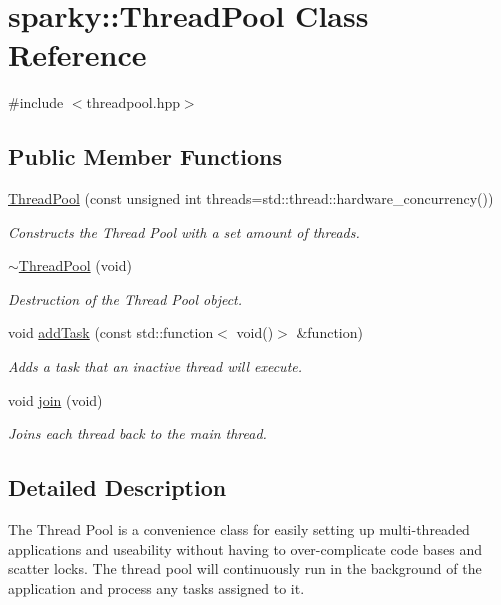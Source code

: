 \hypertarget{classsparky_1_1_thread_pool}{}\section{sparky\+:\+:Thread\+Pool Class Reference}
\label{classsparky_1_1_thread_pool}


{\ttfamily \#include $<$threadpool.\+hpp$>$}

\subsection*{Public Member Functions}
\begin{DoxyCompactItemize}
\item 
\hyperlink{classsparky_1_1_thread_pool_ac153de2ca1a6b692c48e000c7891e439}{Thread\+Pool} (const unsigned int threads=std\+::thread\+::hardware\+\_\+concurrency())
\begin{DoxyCompactList}\small\item\em Constructs the Thread Pool with a set amount of threads. \end{DoxyCompactList}\item 
\hyperlink{classsparky_1_1_thread_pool_ae54a60ab84b11b3bb6dcccea9ba4d841}{$\sim$\+Thread\+Pool} (void)
\begin{DoxyCompactList}\small\item\em Destruction of the Thread Pool object. \end{DoxyCompactList}\item 
void \hyperlink{classsparky_1_1_thread_pool_a3faeacdbbab736f1461c7ea53739e34f}{add\+Task} (const std\+::function$<$ void()$>$ \&function)
\begin{DoxyCompactList}\small\item\em Adds a task that an inactive thread will execute. \end{DoxyCompactList}\item 
void \hyperlink{classsparky_1_1_thread_pool_a24ce7704a54be1f5b956d61bc6c0fc7f}{join} (void)
\begin{DoxyCompactList}\small\item\em Joins each thread back to the main thread. \end{DoxyCompactList}\end{DoxyCompactItemize}


\subsection{Detailed Description}
The Thread Pool is a convenience class for easily setting up multi-\/threaded applications and useability without having to over-\/complicate code bases and scatter locks. The thread pool will continuously run in the background of the application and process any tasks assigned to it.

